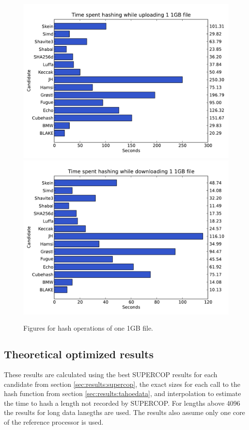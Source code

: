 \documentclass[english,12pt,a4paper]{book}
\begin{document}
\begin{figure}[h!]
    \centering
    \includegraphics[width=0.9\columnwidth]
        {graphs/Timespenthashingwhileuploading11GBfile.pdf}
    \includegraphics[width=0.9\columnwidth]
        {graphs/Timespenthashingwhiledownloading11GBfile.pdf}
    \caption{Figures for hash operations of one 1GB file.}
    \label{fig:graph:11gb}
\end{figure}

\subsection{Theoretical optimized results}
These results are calculated using the best \ac{SUPERCOP} results for each
candidate from section \ref{sec:results:supercop}, the exact sizes for each
call to the hash function from section \ref{sec:results:tahoedata}, and
interpolation to estimate the time to hash a length not recorded by
\ac{SUPERCOP}. For lengths above 4096 the results for long data lanegths are
used. The results also assume only one core of the reference processor is used.
\end{document}
